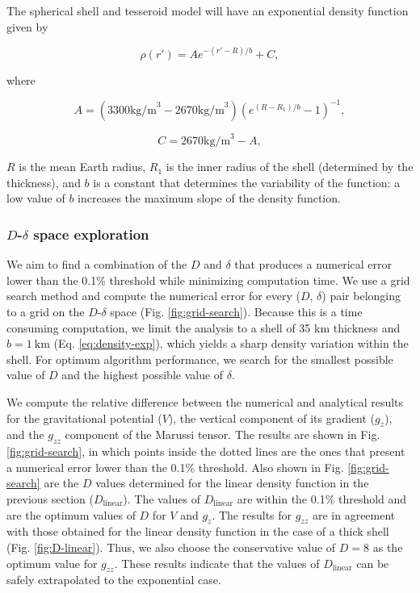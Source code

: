 \documentclass[extra, referee]{gji}
\begin{document}
The spherical shell and tesseroid model will have an exponential density function given
by

\begin{equation}
    \rho(r') = A e^{-(r' - R)/b} + C,
\label{eq:density-exp}
\end{equation}

\noindent where

\begin{equation}
    A =
    (3300 \text{kg/m}^3 - 2670 \text{kg/m}^3)
    \left( e^{( R - R_1 )/b} - 1 \right)^{-1},
\end{equation}

\begin{equation}
    C =
    2670 \text{kg/m}^3 - A,
\end{equation}

\noindent $R$ is the mean Earth radius, $R_1$ is the inner radius of the
shell (determined by the thickness), and $b$ is a constant that determines the
variability of the function: a low value of $b$ increases the maximum slope of the
density function.


\subsubsection{$D$-$\delta$ space exploration}

We aim to find a combination of the $D$ and $\delta$ that produces a numerical error
lower than the 0.1\% threshold while minimizing computation time.
We use a grid search method and compute the numerical error for every ($D$, $\delta$)
pair belonging to a grid on the $D$-$\delta$ space (Fig. \ref{fig:grid-search}).
Because this is a time consuming computation, we limit the analysis to a shell of 35 km
thickness and $b = 1\ \text{km}$ (Eq. \ref{eq:density-exp}), which yields a
sharp density variation within the shell.
For optimum algorithm performance, we search for the smallest possible value of $D$ and
the highest possible value of $\delta$.

We compute the relative difference between the numerical and analytical results for the
gravitational potential ($V$), the vertical component of its gradient ($g_z$), and the
$g_{zz}$ component of the Marussi tensor.
The results are shown in Fig. \ref{fig:grid-search}, in which points inside the dotted
lines are the ones that present a numerical error lower than the 0.1\% threshold.
Also shown in Fig. \ref{fig:grid-search} are the $D$ values determined for the linear
density function in the previous section ($D_\text{linear}$).
The values of $D_\text{linear}$ are within the 0.1\% threshold and are the optimum
values of $D$ for $V$ and $g_z$.
The results for $g_{zz}$ are in agreement with those obtained for the linear density
function in the case of a thick shell (Fig. \ref{fig:D-linear}).
Thus, we also choose the conservative value of $D=8$ as the optimum value for $g_{zz}$.
These results indicate that the values of $D_\text{linear}$ can be safely extrapolated
to the exponential case.
\end{document}
